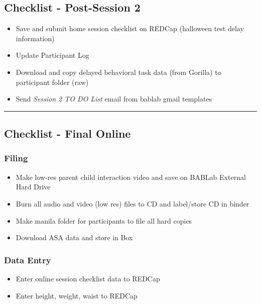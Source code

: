 \documentclass[]{book}
\providecommand{\tightlist}{%
  \setlength{\itemsep}{0pt}\setlength{\parskip}{0pt}}
\begin{document}
\hypertarget{checklist---post-session-2-1}{%
\subsection{Checklist - Post-Session 2}\label{checklist---post-session-2-1}}

\begin{itemize}
\tightlist
\item
  Save and submit home session checklist on REDCap (halloween test delay information)
\item
  Update Participant Log
\item
  Download and copy delayed behavioral task data (from Gorilla) to participant folder (raw)
\item
  Send \emph{Session 2 TO DO List} email from bablab gmail templates
\end{itemize}

\begin{center}\rule{0.5\linewidth}{0.5pt}\end{center}

\hypertarget{checklist---final-online-1}{%
\subsection{Checklist - Final Online}\label{checklist---final-online-1}}

\hypertarget{filing-6}{%
\subsubsection{Filing}\label{filing-6}}

\begin{itemize}
\tightlist
\item
  Make low-res parent child interaction video and save on BABLab External Hard Drive
\item
  Burn all audio and video (low res) files to CD and label/store CD in binder
\item
  Make manila folder for participants to file all hard copies
\item
  Download ASA data and store in Box
\end{itemize}

\hypertarget{data-entry-4}{%
\subsubsection{Data Entry}\label{data-entry-4}}

\begin{itemize}
\tightlist
\item
  Enter online session checklist data to REDCap
\item
  Enter height, weight, waist to REDCap
\end{itemize}
\end{document}
